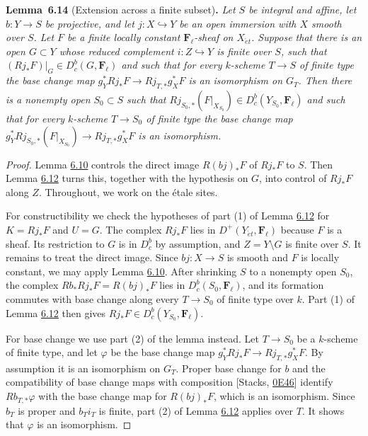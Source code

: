 \documentclass[11pt]{article}
\newenvironment{bpstatement}[2]{\par\addvspace{0.6\baselineskip}\noindent\textbf{#1}#2\textbf{.}\enspace\ignorespaces}
  {\par\addvspace{0.4\baselineskip}}
\newenvironment{bpstatementit}[2]{\begin{bpstatement}{#1}{#2}\itshape\ignorespaces}{\end{bpstatement}}
\providecommand{\Dbc}{}\renewcommand{\Dbc}{D^b_c}
\providecommand{\Fell}{}\renewcommand{\Fell}{\mathbf F_\ell}
\begin{document}
\label{bp45}%
\begin{bpstatementit}{Lemma~6.14}{ (Extension across a finite subset)}
Let \(S\) be integral and affine, let \(b:Y\to S\) be projective, and let \(j:X\hookrightarrow Y\) be an open immersion with \(X\) smooth over \(S\). Let \(F\) be a finite locally constant \(\Fell\)-sheaf on \(X_{\acute{e}t}\). Suppose that there is an open \(G\subset Y\) whose reduced complement \(i:Z\hookrightarrow Y\) is finite over \(S\), such that \((Rj_*F)|_G\in\Dbc(G,\Fell)\) and such that for every \(k\)-scheme \(T\to S\) of finite type the base change map \(g_Y^*Rj_*F\to Rj_{T,*}g_X^*F\) is an isomorphism on \(G_T\). Then there is a nonempty open \(S_0\subset S\) such that \(Rj_{S_0,*}(F|_{X_{S_0}})\in\Dbc(Y_{S_0},\Fell)\) and such that for every \(k\)-scheme \(T\to S_0\) of finite type the base change map \(g_Y^*Rj_{S_0,*}(F|_{X_{S_0}})\to Rj_{T,*}g_X^*F\) is an isomorphism.
\end{bpstatementit}

\begin{proof}[{Proof}]\label{bp46}%
Lemma \hyperref[bp33]{6.10} controls the direct image \(R(bj)_*F\) of \(Rj_*F\) to \(S\). Then Lemma \hyperref[bp38]{6.12} turns this, together with the hypothesis on \(G\), into control of \(Rj_*F\) along \(Z\). Throughout, we work on the étale sites.

For constructibility we check the hypotheses of part (1) of Lemma \hyperref[bp38]{6.12} for \(K=Rj_*F\) and \(U=G\). The complex \(Rj_*F\) lies in \(D^+(Y_{\acute{e}t},\Fell)\) because \(F\) is a sheaf. Its restriction to \(G\) is in \(\Dbc\) by assumption, and \(Z=Y\setminus G\) is finite over \(S\). It remains to treat the direct image. Since \(bj:X\to S\) is smooth and \(F\) is locally constant, we may apply Lemma \hyperref[bp33]{6.10}. After shrinking \(S\) to a nonempty open \(S_0\), the complex \(Rb_*Rj_*F=R(bj)_*F\) lies in \(\Dbc(S_0,\Fell)\), and its formation commutes with base change along every \(T\to S_0\) of finite type over \(k\). Part (1) of Lemma \hyperref[bp38]{6.12} then gives \(Rj_*F\in\Dbc(Y_{S_0},\Fell)\).

For base change we use part (2) of the lemma instead. Let \(T\to S_0\) be a \(k\)-scheme of finite type, and let \(\varphi\) be the base change map \(g_Y^*Rj_*F\to Rj_{T,*}g_X^*F\). By assumption it is an isomorphism on \(G_T\). Proper base change for \(b\) and the compatibility of base change maps with composition [Stacks, \href{https://stacks.math.columbia.edu/tag/0E46}{0E46}] identify \(Rb_{T,*}\varphi\) with the base change map for \(R(bj)_*F\), which is an isomorphism. Since \(b_T\) is proper and \(b_Ti_T\) is finite, part (2) of Lemma \hyperref[bp38]{6.12} applies over \(T\). It shows that \(\varphi\) is an isomorphism.
\end{proof}
\end{document}
